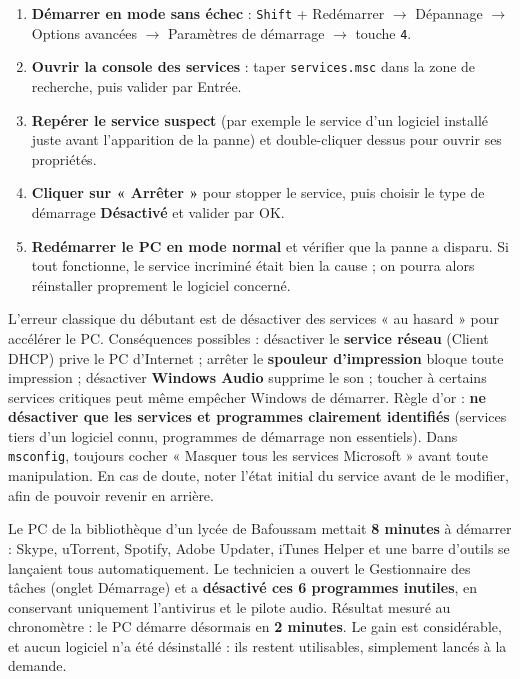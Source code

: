 \documentclass[11pt]{article}
\begin{document}
\begin{methode}
\begin{enumerate}
\item \textbf{Démarrer en mode sans échec} : \texttt{Shift} + Redémarrer $\rightarrow$ Dépannage $\rightarrow$ Options avancées $\rightarrow$ Paramètres de démarrage $\rightarrow$ touche \texttt{4}.
\item \textbf{Ouvrir la console des services} : taper \texttt{services.msc} dans la zone de recherche, puis valider par Entrée.
\item \textbf{Repérer le service suspect} (par exemple le service d'un logiciel installé juste avant l'apparition de la panne) et double-cliquer dessus pour ouvrir ses propriétés.
\item \textbf{Cliquer sur « Arrêter »} pour stopper le service, puis choisir le type de démarrage \textbf{Désactivé} et valider par OK.
\item \textbf{Redémarrer le PC en mode normal} et vérifier que la panne a disparu. Si tout fonctionne, le service incriminé était bien la cause ; on pourra alors réinstaller proprement le logiciel concerné.
\end{enumerate}
\end{methode}

\begin{attention}
L'erreur classique du débutant est de désactiver des services « au hasard » pour accélérer le PC. Conséquences possibles : désactiver le \textbf{service réseau} (Client DHCP) prive le PC d'Internet ; arrêter le \textbf{spouleur d'impression} bloque toute impression ; désactiver \textbf{Windows Audio} supprime le son ; toucher à certains services critiques peut même empêcher Windows de démarrer. Règle d'or : \textbf{ne désactiver que les services et programmes clairement identifiés} (services tiers d'un logiciel connu, programmes de démarrage non essentiels). Dans \texttt{msconfig}, toujours cocher « Masquer tous les services Microsoft » avant toute manipulation. En cas de doute, noter l'état initial du service avant de le modifier, afin de pouvoir revenir en arrière.
\end{attention}

\begin{exemplebox}
Le PC de la bibliothèque d'un lycée de Bafoussam mettait \textbf{8 minutes} à démarrer : Skype, uTorrent, Spotify, Adobe Updater, iTunes Helper et une barre d'outils se lançaient tous automatiquement. Le technicien a ouvert le Gestionnaire des tâches (onglet Démarrage) et a \textbf{désactivé ces 6 programmes inutiles}, en conservant uniquement l'antivirus et le pilote audio. Résultat mesuré au chronomètre : le PC démarre désormais en \textbf{2 minutes}. Le gain est considérable, et aucun logiciel n'a été désinstallé : ils restent utilisables, simplement lancés à la demande.
\end{exemplebox}
\end{document}
